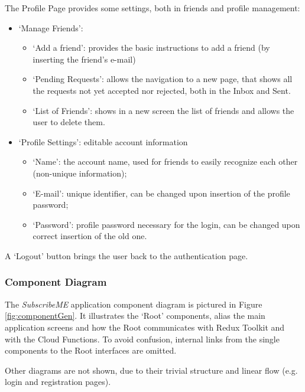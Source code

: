 \documentclass[11pt]{article}
\begin{document}
\vspace{0.5cm}
\vspace{0.2cm}

\noindent The Profile Page provides some settings, both in friends and profile management: \begin{itemize}
    \item `Manage Friends':
          \begin{itemize}
              \item `Add a friend': provides the basic instructions to add a friend (by inserting the friend's e-mail)
              \item `Pending Requests': allows the navigation to a new page, that shows all the requests not yet accepted nor rejected, both in the Inbox and Sent.
              \item `List of Friends': shows in a new screen the list of friends and allows the user to delete them.
          \end{itemize}
    \item `Profile Settings': editable account information
          \begin{itemize}
              \item `Name': the account name, used for friends to easily recognize each other (non-unique information);
              \item `E-mail': unique identifier, can be changed upon insertion of the profile password;
              \item `Password': profile password necessary for the login, can be changed upon correct insertion of the old one.
          \end{itemize}
\end{itemize}

A `Logout' button brings the user back to the authentication page.

\subsubsection{Component Diagram}
The \textit{SubscribeME} application component diagram is pictured in Figure \ref{fig:componentGen}. It illustrates the `Root' components, alias the main application screens and how the Root communicates with Redux Toolkit and with the Cloud Functions. To avoid confusion, internal links from the single components to the Root interfaces are omitted.

Other diagrams are not shown, due to their trivial structure and linear flow (e.g. login and registration pages).
\end{document}
